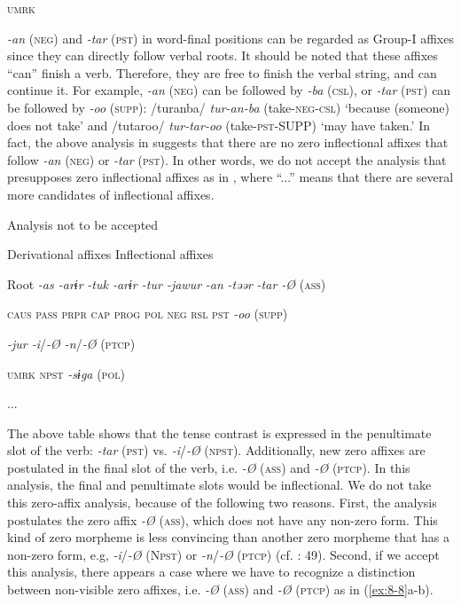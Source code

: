             \textsc{umrk}
\z
\z

\textit{-an} (\textsc{neg}) and \textit{-tar} (\textsc{pst}) in word-final positions can be regarded as Group-I affixes since they can directly follow verbal roots. It should be noted that these affixes “can” finish a verb. Therefore, they are free to finish the verbal string, and can continue it. For example, \textit{-an} (\textsc{neg}) can be followed by \textit{-ba} (\textsc{csl}), or \textit{-tar} (\textsc{pst}) can be followed by \textit{-oo} (\textsc{supp}): /turanba/ \textit{tur-an-ba} (take-\textsc{neg}-\textsc{csl}) ‘because (someone) does not take’ and /tutaroo/ \textit{tur-tar-oo} (take-\textsc{pst}-SUPP) ‘may have taken.’ In fact, the above analysis in  suggests that there are no zero inflectional affixes that follow \textit{-an} (\textsc{neg}) or \textit{-tar} (\textsc{pst}). In other words, we do not accept the analysis that presupposes zero inflectional affixes as in , where “...” means that there are several more candidates of inflectional affixes.

\ea\label{ex:8-7}
  Analysis not to be accepted

    Derivational affixes  Inflectional affixes

  Root  \textit{-as  -arɨr} %
\textit{-tuk  -arɨr  -tur  -jawur} %
\textit{-an} %
\textit{-təər} %
\textit{-tar  -Ø} (\textsc{ass})

    \textsc{caus}  \textsc{pass}  \textsc{prpr}  \textsc{cap}  \textsc{prog}  \textsc{pol}  \textsc{neg}  \textsc{rsl}  \textsc{pst}  \textit{-oo} (\textsc{supp})

          \textit{-jur    -i}/\textit{-Ø  -n}/\textit{-Ø} (\textsc{ptcp})

          \textsc{umrk}    \textsc{npst}  \textit{-sɨga} (\textsc{pol})

                ...
\z

The above table shows that the tense contrast is expressed in the penultimate slot of the verb: \textit{-tar} (\textsc{pst}) vs. \textit{-i}/\textit{-Ø} (\textsc{npst}). Additionally, new zero affixes are postulated in the final slot of the verb, i.e. \textit{-Ø} (\textsc{ass}) and \textit{-Ø} (\textsc{ptcp}). In this analysis, the final and penultimate slots would be inflectional. We do not take this zero-affix analysis, because of the following two reasons. First, the analysis postulates the zero affix \textit{-Ø} (\textsc{ass}), which does not have any non-zero form. This kind of zero morpheme is less convincing than another zero morpheme that has a non-zero form, e.g, \textit{-i}/\textit{-Ø} (N\textsc{pst}) or \textit{-n}/\textit{-Ø} (\textsc{ptcp}) (cf. \citealt{Haas1974}: 49). Second, if we accept this analysis, there appears a case where we have to recognize a distinction between non-visible zero affixes, i.e. \textit{-Ø} (\textsc{ass}) and \textit{-Ø} (\textsc{ptcp}) as in (\ref{ex:8-8}a-b).

